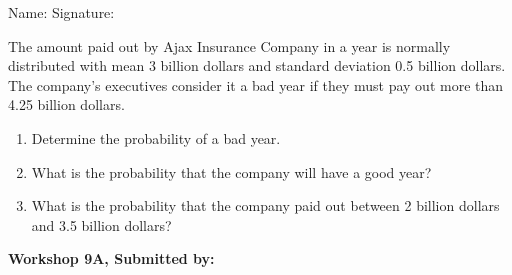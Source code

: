 \documentclass[11pt]{book}\usepackage[]{graphicx}\usepackage[]{color}
\begin{document}
\begin{exercises}
\begin{exercise}
\begin{center}
{{\vspace{4mm}
Name: \underline{\phantom{xxxxxxxxxxxxxxxxxxxxxxxx}} Signature: \underline{\phantom{xxxxxxxxxxxxxxxxxxxxxxxx}}
 }}
\end{center}

The amount paid out by Ajax Insurance Company in a year is normally distributed with mean 3 billion dollars and standard deviation 0.5 billion dollars. The company’s executives consider it a bad year if they must pay out more than 4.25 billion dollars.

\begin{enumerate}
  \item Determine the probability of a bad year.
  \item What is the probability that the company will have a good year?
  \item What is the probability that the company paid out between 2 billion dollars and 3.5 billion dollars?
\end{enumerate}

\end{exercise}
\begin{solution}  %

\end{solution}

\clearpage

    \begin{exercise}  %

    \begin{center}
\begin{flushleft}\textbf{\large \hfill Workshop 9A, Submitted by: }\end{flushleft}

\end{center}


\end{exercise}
\end{exercises}
\end{document}
